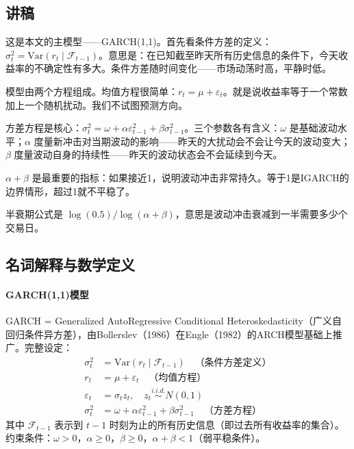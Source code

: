 \documentclass[11pt,a4paper]{article}
\begin{document}
\subsection*{讲稿}
这是本文的主模型——GARCH(1,1)。首先看条件方差的定义：\(\sigma_t^2 = \text{Var}(r_t \mid \mathcal{F}_{t-1})\)。意思是：在已知截至昨天所有历史信息的条件下，今天收益率的不确定性有多大。条件方差随时间变化——市场动荡时高，平静时低。

模型由两个方程组成。均值方程很简单：\(r_t = \mu + \varepsilon_t\)。就是说收益率等于一个常数加上一个随机扰动。我们不试图预测方向。

方差方程是核心：\(\sigma_t^2 = \omega + \alpha \varepsilon_{t-1}^2 + \beta \sigma_{t-1}^2\)。三个参数各有含义：\(\omega\) 是基础波动水平；\(\alpha\) 度量新冲击对当期波动的影响——昨天的大扰动会不会让今天的波动变大；\(\beta\) 度量波动自身的持续性——昨天的波动状态会不会延续到今天。

\(\alpha + \beta\) 是最重要的指标：如果接近1，说明波动冲击非常持久。等于1是IGARCH的边界情形，超过1就不平稳了。

半衰期公式是 \(\log(0.5) / \log(\alpha + \beta)\)，意思是波动冲击衰减到一半需要多少个交易日。

\subsection*{名词解释与数学定义}

\paragraph{GARCH(1,1)模型} GARCH = Generalized AutoRegressive Conditional Heteroskedasticity（广义自回归条件异方差），由Bollerslev（1986）在Engle（1982）的ARCH模型基础上推广。完整设定：
\begin{align*}
\sigma_t^2 &= \text{Var}(r_t \mid \mathcal{F}_{t-1}) \quad \text{（条件方差定义）}\\
r_t &= \mu + \varepsilon_t \quad \text{（均值方程）}\\
\varepsilon_t &= \sigma_t z_t, \quad z_t \stackrel{i.i.d.}{\sim} N(0,1)\\
\sigma_t^2 &= \omega + \alpha \varepsilon_{t-1}^2 + \beta \sigma_{t-1}^2 \quad \text{（方差方程）}
\end{align*}
其中 \(\mathcal{F}_{t-1}\) 表示到 \(t-1\) 时刻为止的所有历史信息（即过去所有收益率的集合）。
约束条件：\(\omega > 0\)，\(\alpha \geq 0\)，\(\beta \geq 0\)，\(\alpha + \beta < 1\)（弱平稳条件）。
\end{document}

